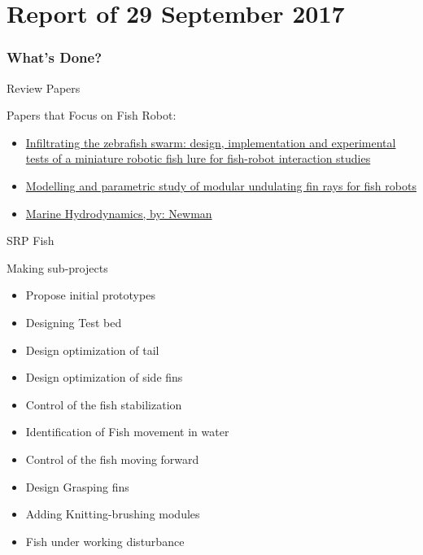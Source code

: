 \documentclass[aspectratio=169, xcolor=table]{beamer}
\begin{document}
\part{Report of 29 September 2017 }
\frame{\partpage}
\section{What's Done?}

\begin{frame}{Review Papers}
\begin{block}{Papers that Focus on Fish Robot:}
\begin{itemize}
\item \href{run:C:/Users/Mohammad/Google Drive/My read papers/5th Presentation/Miniature_Fish.pdf}{Infiltrating the zebrafish swarm: design, implementation and experimental tests of a miniature robotic fish lure for fish-robot interaction studies}
\vspace{0.7cm}
\item \href{run:C:/Users/Mohammad/Google Drive/My read papers/5th Presentation/fins_for_fish.pdf}{Modelling and parametric study of modular undulating fin rays for fish robots}

\vspace{0.7cm}
\item \href{run:C:/Users/Mohammad/Google Drive/My read papers/5th Presentation/Book_Model_Test.pdf
}{Marine Hydrodynamics, by: Newman}
\end{itemize}
\end{block}
\end{frame}





\begin{frame}{SRP Fish}
\begin{block}{Making sub-projects}
\begin{itemize}
\color{blue}
\item Propose initial prototypes
\item Designing Test bed
\item Design optimization of tail
\item Design optimization of side fins
\item Control of the fish stabilization
\color{black}
\item Identification of Fish movement in water 
\item Control of the fish moving forward
\item Design Grasping fins
\item Adding Knitting-brushing modules
\item Fish under working disturbance
\end{itemize}
\end{block}
\end{frame}
\end{document}
